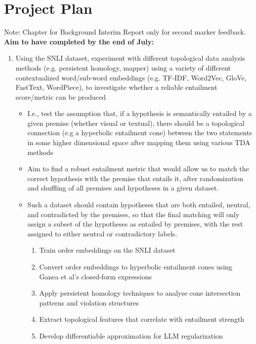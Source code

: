 \documentclass[12pt,twoside]{report}
\begin{document}
\chapter{Project Plan}
Note: Chapter for Background Interim Report only for second marker feedback. \newline \newline
\textbf{Aim to have completed by the end of July:}
\begin{enumerate}[itemsep=0pt]
    \item Using the SNLI dataset, experiment with different topological data analysis methods (e.g. persistent homology, mapper) using a variety of different contextualized word/sub-word embeddings (e.g. TF-IDF, Word2Vec, GloVe, FastText, WordPiece), to investigate whether a reliable entailment score/metric can be produced
    \begin{itemize} [topsep=0pt, itemsep=0pt]
        \item I.e., test the assumption that, if a hypothesis is semantically entailed by a given premise (whether visual or textual), there should be a topological connection (e.g a hyperbolic entailment cone) between the two statements in some higher dimensional space after mapping them using various TDA methods
        \item Aim to find a robust entailment metric that would allow us to match the correct hypothesis with the premise that entails it, after randomization and shuffling of all premises and hypotheses in a given dataset. 
        \item Such a dataset should contain hypotheses that are both entailed, neutral, and contradicted by the premises, so that the final matching will only assign a subset of the hypotheses as entailed by premises, with the rest assigned to either neutral or contradictory labels.
        \begin{enumerate}[topsep=0pt, itemsep=0pt]
            \item Train order embeddings on the SNLI dataset
            \item Convert order embeddings to hyperbolic entailment cones using Ganea et al's closed-form expressions
            \item Apply persistent homology techniques to analyse cone intersection patterns and violation structures
            \item Extract topological features that correlate with entailment strength
            \item Develop differentiable approximation for LLM regularization

\end{enumerate}
\end{itemize}
\end{enumerate}
\end{document}
